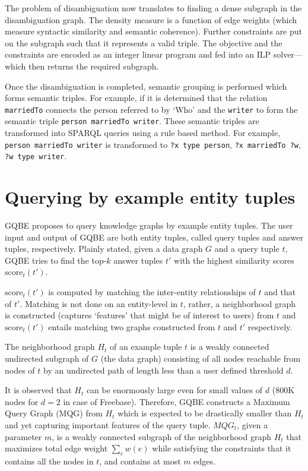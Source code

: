\documentclass[a4paper, twoside, 12pt]{report}
\begin{document}
The problem of disambiguation now translates to finding a dense subgraph in the disambiguation graph. The density measure is a function of edge weights (which measure syntactic similarity and semantic coherence). Further constraints are put on the subgraph such that it represents a valid triple. The objective and the constraints are encoded as an integer linear program and fed into an ILP solver---which then returns the required subgraph.

Once the disambiguation is completed, semantic grouping is performed which forms semantic triples. For example, if it is determined that the relation \texttt{marriedTo} connects the person referred to by `Who' and the \texttt{writer} to form the semantic triple \texttt{person marriedTo writer}. These semantic triples are transformed into SPARQL queries using a rule based method. For example, \texttt{person marriedTo writer} is transformed to \texttt{?x type person}, \texttt{?x marriedTo ?w}, \texttt{?w type writer}.


\section{Querying by example entity tuples}


 GQBE \cite{jayaram2013querying} proposes to query knowledge graphs by example entity tuples. The user input and output of GQBE are both entity tuples,
called query tuples and answer tuples, respectively. Plainly stated, given a data graph $G$ and a query tuple $t$, GQBE tries to find the top-$k$ answer tuples $t'$ with the highest similarity scores $\text{score}_t(t')$.


 $\text{score}_t(t')$ is computed by matching the inter-entity relationships of $t$ and that of $t'$. Matching is not done on an entity-level in $t$, rather, a neighborhood graph is constructed (captures `features' that might be of interest to users) from $t$ and $\text{score}_t(t')$ entails matching two
 graphs constructed from $t$ and $t'$ respectively.

 The neighborhood graph $H_t$ of an example tuple $t$ is a weakly connected undirected subgraph of $G$ (the data graph) consisting of all nodes reachable from nodes of $t$ by an undirected path of length less than a user defined threshold $d$.

 It is observed that $H_t$ can be enormously large even for small values of $d$ (800K nodes for $d = 2$ in case of Freebase). Therefore, GQBE constructs a Maximum Query Graph (MQG) from $H_t$ which is expected to be drastically smaller than $H_t$ and yet capturing important features of the query tuple. $MQG_t$, given
 a parameter $m$, is a weakly connected subgraph of the  neighborhood graph $H_t$ that maximizes total edge weight
 $\sum_e w(e)$ while satisfying the constraints that it contains all the nodes in $t$, and contains at most $m$ edges.
\end{document}
